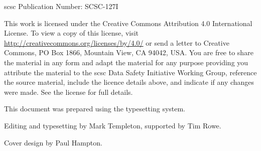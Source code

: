 %
%

%
%

\pagestyle{FirstPageFrontCover}
%
%



\acrshort{scsc} Publication Number: SCSC-127I%

This work is licensed under the Creative Commons Attribution 4.0 International License. To view a copy of this license, visit \href{http://creativecommons.org/licenses/by/4.0/}{http://creativecommons.org/licenses/by/4.0/} or send a letter to Creative Commons, PO Box 1866, Mountain View, CA 94042, USA\@. You are free to share the material in any form and adapt the material for any purpose providing you attribute the material to the \gls{scsc} Data Safety Initiative Working Group, reference the source material, include the licence details above, and indicate if any changes were made.  See the license for full details.

This document was prepared using the \LaTeXe\/ typesetting system.

Editing and typesetting by Mark Templeton, \cbstart supported by Tim Rowe\cbend.

Cover design by Paul Hampton.



